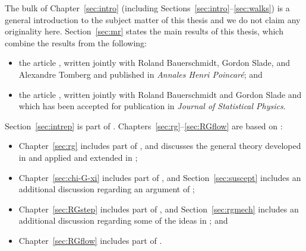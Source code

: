 The bulk of Chapter~\ref{sec:intro} (including Sections~\ref{sec:intro}--\ref{sec:walks})
is a general introduction to the
subject matter of this thesis and we do not claim any originality here. Section~\ref{sec:mr}
states the main results of this thesis, which combine the results from the following:
\begin{itemize}
\item
the article \cite{BSTW-clp}, written jointly with
Roland Bauerschmidt, Gordon Slade, and Alexandre Tomberg and
published in \textit{Annales Henri Poincar\'{e}};
and

\item
the article \cite{BSW-saw-sa}, written jointly with
Roland Bauerschmidt and Gordon Slade and which has been accepted for publication
in \textit{Journal of Statistical Physics}.
\end{itemize}
Section~\ref{sec:intrep} is part of \cite{BSW-saw-sa}.
Chapters~\ref{sec:rg}--\ref{sec:RGflow} are based on \cite{BSTW-clp,BSW-saw-sa}:
\begin{itemize}
\item
Chapter~\ref{sec:rg} includes part of \cite{BSTW-clp,BSW-saw-sa},
and discusses the general theory developed in
\cite{BS-rg-norm,BS-rg-loc,BBS-rg-pt,BS-rg-IE,BS-rg-step}
and applied and extended in
\cite{BBS-saw4-log,BBS-saw4,ST-phi4};

\item
Chapter~\ref{sec:chi-G-xi} includes part of \cite{BSTW-clp,BSW-saw-sa},
and Section~\ref{sec:suscept} includes an additional discussion regarding an argument
of \cite{BBS-saw4-log};

\item
Chapter~\ref{sec:RGstep} includes part of \cite{BSTW-clp}, and
Section~\ref{sec:rgmech} includes an additional discussion regarding some of the ideas in
\cite{BS-rg-step}; and

\item
Chapter~\ref{sec:RGflow} includes part of \cite{BSW-saw-sa}.
\end{itemize}




